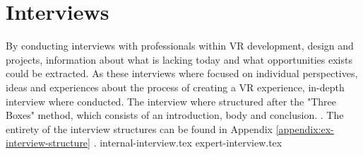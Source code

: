 \section{Interviews}
By conducting interviews with professionals within VR development, design and projects, information about what is lacking today and what opportunities exists could be extracted. As these interviews where focused on individual perspectives, ideas and experiences about the process of creating a VR experience, in-depth interview where conducted.
\cite{interview:Boyce2006} The interview where structured after the "Three Boxes" method, which consists of an introduction, body and conclusion. \cite{interview:Hall2013}. The entirety of the interview structures can be found in Appendix \ref{appendix:ex-interview-structure} .
{internal-interview.tex}
{expert-interview.tex}
